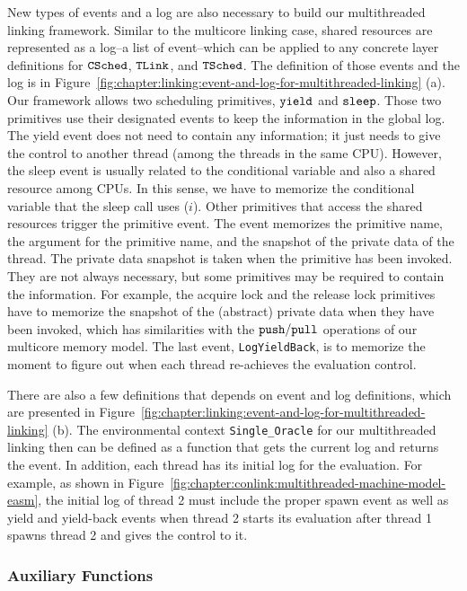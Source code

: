 New types of  events and a log  are also necessary to build our multithreaded linking framework. 
Similar to the multicore linking case, 
shared resources are represented as a log--a list of event--which can be applied to any concrete layer definitions for 
${{\mathrm{\texttt{CSched}}}}$, ${{\mathrm{\texttt{TLink}}}}$, and ${{\mathrm{\texttt{TSched}}}}$.
The definition of those events and the log is in Figure~\ref{fig:chapter:linking:event-and-log-for-multithreaded-linking} (a).
Our framework allows two scheduling primitives, 
${\mathrm{\texttt{yield}}}$ and ${\mathrm{\texttt{sleep}}}$. 
Those two primitives use their designated events to keep the information in the global log. 
The yield event does not need to contain any information; it just needs to give the control
to another thread (among the threads in the same CPU). 
However, the sleep event is usually related to the conditional variable and also a shared resource among CPUs.
In this sense, we have to memorize the conditional variable that the sleep call uses ($i$).
Other primitives that access the shared resources trigger the primitive event. 
The event memorizes the primitive name, the argument for the primitive name,
and the snapshot of the private data of the thread.
The private data snapshot is taken  when the primitive has been invoked. 
They are not always necessary, but some primitives may be required to contain the information.
For example, the acquire lock and the release lock primitives have to memorize the snapshot of the (abstract) private data when they have been invoked, which has similarities with the ${\mathrm{\texttt{push}}}/{\mathrm{\texttt{pull}}}$ operations of our multicore memory model. 
The last event, \lstinline$LogYieldBack$, is to memorize the moment to figure out when each thread re-achieves the evaluation control. 

There are also a few definitions that depends on event and log definitions, which are presented in Figure~\ref{fig:chapter:linking:event-and-log-for-multithreaded-linking} (b).
The environmental context \lstinline$Single_Oracle$  for our multithreaded linking
then can be defined as a function that gets the current log and returns the event. 
In addition,
each thread has its initial log for the evaluation. 
For example, as shown in Figure~\ref{fig:chapter:conlink:multithreaded-machine-model-easm},
the initial log of thread 2 must include the proper spawn event as well as yield and yield-back events
when thread 2 starts its evaluation after thread 1 spawns  thread 2 and gives the control to it.

\subsubsection{Auxiliary Functions}

